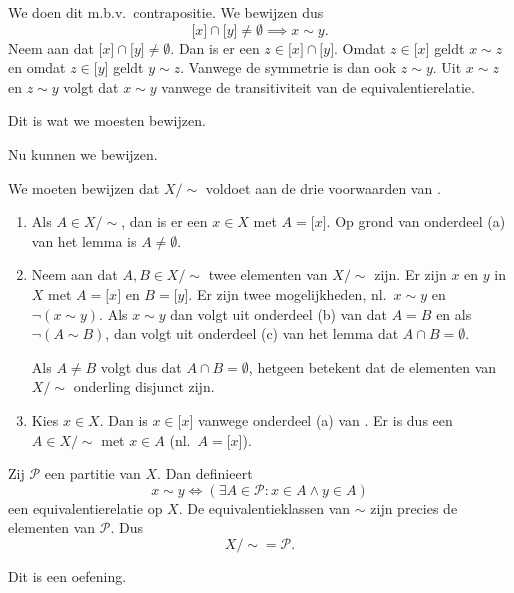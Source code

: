 \begin{bewijs}{}{}
\begin{enumerate}[label = (\alph*)]
            We doen dit m.b.v.\ contrapositie.
            We bewijzen dus
            \[
                \lbrack x \rbrack \cap \lbrack y \rbrack \neq \emptyset \implies x \sim y.
            \]
            Neem aan dat $\lbrack x \rbrack \cap \lbrack y \rbrack \neq \emptyset$.
            Dan is er een $z \in \lbrack x \rbrack \cap \lbrack y \rbrack$.
            Omdat $z \in \lbrack x \rbrack$ geldt $x \sim z$ en omdat $z \in \lbrack y \rbrack$ geldt $y \sim z$.
            Vanwege de symmetrie is dan ook  $z \sim y$.
            Uit $x \sim z$ en $z \sim y$ volgt dat $x \sim y$ vanwege de transitiviteit van de equivalentierelatie.
    \end{enumerate}
            Dit is wat we moesten bewijzen.
\end{bewijs}
Nu kunnen we  bewijzen.
\begin{bewijs}{}{}
    We moeten bewijzen dat $X \slash \sim$ voldoet aan de drie voorwaarden van .
    \begin{enumerate}[label = (\alph*)]
        \item Als $A \in X \slash \sim$, dan is er een $x \in X$ met $A = \lbrack x \rbrack$.
            Op grond van onderdeel (a) van het lemma is $A \neq \emptyset$.
        \item Neem aan dat $A, B \in X \slash \sim$ twee elementen van $X \slash \sim$ zijn.
            Er zijn $x$ en $y$ in $X$ met $A = \lbrack x \rbrack$ en $B = \lbrack y \rbrack$.
            Er zijn twee mogelijkheden, nl.\ $x \sim y$ en $\neg(x \sim y)$.
            Als $x \sim y$ dan volgt uit onderdeel (b) van  dat $A = B$ en als $\neg(A \sim B)$, dan volgt uit onderdeel (c) van het lemma dat $A \cap B = \emptyset$.

            Als $A \neq B$ volgt dus dat $A \cap B = \emptyset$, hetgeen betekent dat de elementen van $X \slash \sim$ onderling disjunct zijn.
        \item Kies $x \in X$.
            Dan is $x \in \lbrack x \rbrack$ vanwege onderdeel (a) van .
            Er is dus een $A \in X \slash \sim$ met $x \in A$ (nl.\ $A = \lbrack x\rbrack$).
    \end{enumerate}
\end{bewijs}

\begin{stelling}{}{}
    Zij $\mathcal{P}$ een partitie van $X$.
    Dan definieert
    \[
        x \sim y \iff (\exists A \in \mathcal{P}: x \in A \land y \in A)
    \] een equivalentierelatie op $X$.
    De equivalentieklassen van $\sim$ zijn precies de elementen van $\mathcal{P}$.
    Dus
    \[
        X \slash \sim = \mathcal{P}.
    \]
\end{stelling}
\begin{bewijs}{}{}
    Dit is een oefening.
\end{bewijs}
